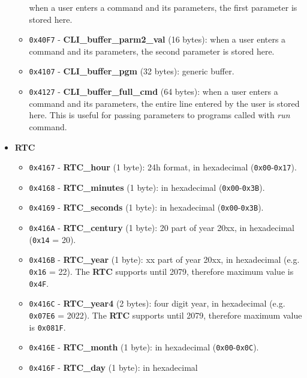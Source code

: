 \begin{itemize}
\begin{itemize}
                when a user enters a command and its parameters, the first parameter
                is stored here.
                \item \texttt{0x40F7} - \textbf{CLI\_buffer\_parm2\_val} (16 bytes):
                when a user enters a command and its parameters, the second parameter
                is stored here.
                \item \texttt{0x4107} - \textbf{CLI\_buffer\_pgm} (32 bytes): generic
                buffer.
                \item \texttt{0x4127} - \textbf{CLI\_buffer\_full\_cmd} (64 bytes):
                when a user enters a command and its parameters, the entire line
                entered by the user is stored here. This is useful for passing
                parameters to programs called with \textit{run} command.
            \end{itemize}
            \item \textbf{RTC}
            \begin{itemize}
                \item \texttt{0x4167} - \textbf{RTC\_hour} (1 byte): 24h format,
                in hexadecimal (\texttt{0x00}-\texttt{0x17}).
                \item \texttt{0x4168} - \textbf{RTC\_minutes} (1 byte): in
                hexadecimal (\texttt{0x00}-\texttt{0x3B}).
                \item \texttt{0x4169} - \textbf{RTC\_seconds} (1 byte): in
                hexadecimal (\texttt{0x00}-\texttt{0x3B}).
                \item \texttt{0x416A} - \textbf{RTC\_century} (1 byte): 20 part of
                year 20xx, in hexadecimal (\texttt{0x14} = 20).
                \item \texttt{0x416B} - \textbf{RTC\_year} (1 byte): xx part of
                year 20xx, in hexadecimal (e.g. \texttt{0x16} = 22). The \textbf{RTC}
                supports until 2079, therefore maximum value is \texttt{0x4F}.
                \item \texttt{0x416C} - \textbf{RTC\_year4} (2 bytes): four digit
                year, in hexadecimal (e.g. \texttt{0x07E6} = 2022). The \textbf{RTC}
                supports until 2079, therefore maximum value is \texttt{0x081F}.
                \item \texttt{0x416E} - \textbf{RTC\_month} (1 byte): in
                hexadecimal (\texttt{0x00}-\texttt{0x0C}).
                \item \texttt{0x416F} - \textbf{RTC\_day} (1 byte): in hexadecimal

\end{itemize}
\end{itemize}
